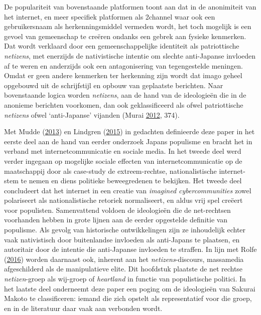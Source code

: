 \documentclass[10.5pt,dutch,]{article}
\begin{document}
De populariteit van bovenstaande platformen toont aan dat in de
anonimiteit van het internet, en meer specifiek platformen als 2channel
waar ook een gebruikersnaam als herkenningsmiddel vermeden wordt, het
toch mogelijk is een gevoel van gemeenschap te creëren ondanks een
gebrek aan fysieke kenmerken. Dat wordt verklaard door een
gemeenschappelijke identiteit als patriottische \emph{netizens}, met
enerzijds de nativistische intentie om slechte anti-Japanse invloeden af
te weren en anderzijds ook een antagonisering van tegengestelde
meningen. Omdat er geen andere kenmerken ter herkenning zijn wordt dat
imago geheel opgebouwd uit de schrijfstijl en opbouw van geplaatste
berichten. Naar bovenstaande logica worden \emph{netizens}, aan de hand
van de ideologieën die in de anonieme berichten voorkomen, dan ook
geklassificeerd als ofwel patriottische \emph{netizens} ofwel
`anti-Japanse' vijanden (Murai
\protect\hyperlink{ref-muraiux5fnetux5f2012}{2012}, 374).

Met Mudde (\protect\hyperlink{ref-muddeux5foxfordux5f2013}{2013}) en
Lindgren (\protect\hyperlink{ref-lindgrenux5fdevelopingux5f2015}{2015})
in gedachten definieerde deze paper in het eerste deel aan de hand van
eerder onderzoek Japans populisme en bracht het in verband met
internetcommunicatie en sociale media. In het tweede deel werd verder
ingegaan op mogelijke sociale effecten van internetcommunicatie op de
maatschappij door als case-study de extreem-rechtse, nationalistische
internet-stem te nemen en diens politieke beweegredenen te bekijken. Het
tweede deel concludeert dat het internet in een creatie van
\emph{imagined cybercommunities} zowel polariseert als nationalistische
retoriek normaliseert, en aldus vrij spel creëert voor populisten.
Samenvattend voldoen de ideologieën die de net-rechtsen voorhanden
hebben in grote lijnen aan de eerder opgestelde definitie van populisme.
Als gevolg van historische ontwikkelingen zijn ze inhoudelijk echter
vaak nativistisch door buitenlandse invloeden als anti-Japans te
plaatsen, en autoritair door de intentie die anti-Japanse invloeden te
straffen. In lijn met Rolfe
(\protect\hyperlink{ref-rolfeux5freinventionux5f2016}{2016}) worden
daarnaast ook, inherent aan het \emph{netizens}-discours, massamedia
afgeschilderd als de manipulatieve elite. Dit hoofdstuk plaatste de net
rechtse \emph{netizen}-groep als wij-groep of \emph{heartland} in
functie van populistische politici. In het laatste deel onderneemt deze
paper een poging om de ideologieën van Sakurai Makoto te classificeren:
iemand die zich opstelt als representatief voor die groep, en in de
literatuur daar vaak aan verbonden wordt.
\end{document}
